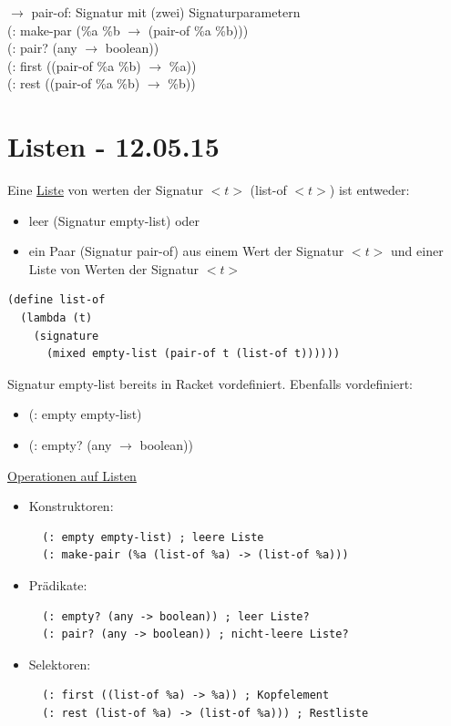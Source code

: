 \documentclass[a4paper, 20pt, openany]{book}
\begin{document}
$\rightarrow$ pair-of: Signatur mit (zwei) Signaturparametern \\

(: make-par (\%a \%b $\rightarrow$ (pair-of \%a \%b))) \\
(: pair? (any $\rightarrow$ boolean)) \\
(: first ((pair-of \%a \%b) $\rightarrow$ \%a)) \\
(: rest ((pair-of \%a \%b) $\rightarrow$ \%b)) \\ 

\chapter{Listen - 12.05.15}
Eine \underline{Liste} von werten der Signatur $<t>$ (list-of $<t>$) ist entweder: 

\begin{itemize}
  \item leer (Signatur empty-list) oder
  \item ein Paar (Signatur pair-of) aus einem Wert der Signatur $<t>$ und einer Liste von Werten der Signatur $<t>$
\end{itemize} 

\begin{lstlisting}
(define list-of 
  (lambda (t) 
    (signature 
      (mixed empty-list (pair-of t (list-of t))))))
\end{lstlisting} 

Signatur empty-list bereits in Racket vordefiniert. Ebenfalls vordefiniert: 

\begin{itemize}
  \item (: empty empty-list) 
  \item (: empty? (any $\rightarrow$ boolean))
\end{itemize}

\underline{Operationen auf Listen}
\begin{itemize}
  \item Konstruktoren:
  
  \begin{lstlisting}
  (: empty empty-list) ; leere Liste
  (: make-pair (%a (list-of %a) -> (list-of %a)))
  \end{lstlisting}
  
  \item Prädikate: 
  
  \begin{lstlisting}
  (: empty? (any -> boolean)) ; leer Liste? 
  (: pair? (any -> boolean)) ; nicht-leere Liste?
  \end{lstlisting}
  
  \item Selektoren:
  \begin{lstlisting}  
  (: first ((list-of %a) -> %a)) ; Kopfelement 
  (: rest (list-of %a) -> (list-of %a))) ; Restliste
  \end{lstlisting}
\end{itemize}
\end{document}

